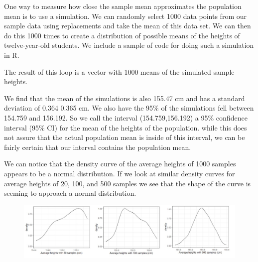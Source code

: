 \documentclass[
]{book}
\newenvironment{Shaded}{\begin{snugshade}}{\end{snugshade}}
\newcommand{\AttributeTok}[1]{\textcolor[rgb]{0.77,0.63,0.00}{#1}}
\newcommand{\CommentTok}[1]{\textcolor[rgb]{0.56,0.35,0.01}{\textit{#1}}}
\newcommand{\ConstantTok}[1]{\textcolor[rgb]{0.00,0.00,0.00}{#1}}
\newcommand{\ControlFlowTok}[1]{\textcolor[rgb]{0.13,0.29,0.53}{\textbf{#1}}}
\newcommand{\DecValTok}[1]{\textcolor[rgb]{0.00,0.00,0.81}{#1}}
\newcommand{\FunctionTok}[1]{\textcolor[rgb]{0.00,0.00,0.00}{#1}}
\newcommand{\NormalTok}[1]{#1}
\newcommand{\OtherTok}[1]{\textcolor[rgb]{0.56,0.35,0.01}{#1}}
\newcommand{\SpecialCharTok}[1]{\textcolor[rgb]{0.00,0.00,0.00}{#1}}
\theoremstyle{definition}
\theoremstyle{definition}
\theoremstyle{definition}
\theoremstyle{definition}
\theoremstyle{remark}
\begin{document}
One way to measure how close the sample mean approximates the population mean is to use a simulation. We can randomly select 1000 data points from our sample data using replacements and take the mean of this data set. We can then do this 1000 times to create a distribution of possible means of the heights of twelve-year-old students. We include a sample of code for doing such a simulation in R.

\begin{Shaded}
\end{Shaded}

The result of this loop is a vector with 1000 means of the simulated sample heights.

We find that the mean of the simulations is also 155.47 cm and has a standard deviation of 0.364 0.365 cm. We also have the 95\% of the simulations fell between 154.759 and 156.192. So we call the interval (154.759,156.192) a 95\% confidence interval (95\% CI) for the mean of the heights of the population. while this does not assure that the actual population mean is inside of this interval, we can be fairly certain that our interval contains the population mean.

We can notice that the density curve of the average heights of 1000 samples appears to be a normal distribution. If we look at similar density curves for average heights of 20, 100, and 500 samples we see that the shape of the curve is seeming to approach a normal distribution.

\begin{figure}

{\centering \includegraphics[width=1\linewidth]{images/heights_averages} 

}

\end{figure}
\end{document}
